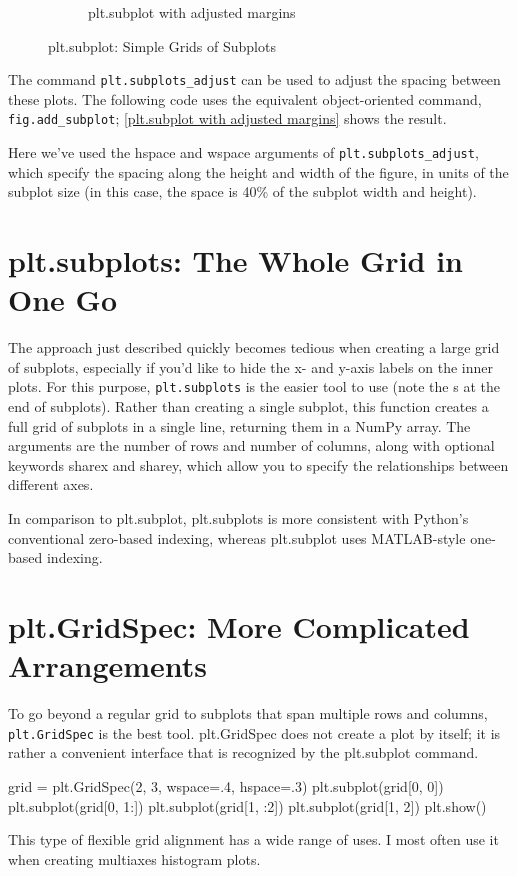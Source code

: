 \begin{figure}
\begin{subfigure}[b]{.45\textwidth}
        \caption{plt.subplot with adjusted margins}
        \label{plt.subplot with adjusted margins}
    \end{subfigure}
    \caption{plt.subplot: Simple Grids of Subplots}
\end{figure}

The command \verb|plt.subplots_adjust| can be used to adjust the spacing between
these plots. The following code uses the equivalent object-oriented command,
\verb|fig.add_subplot|; \autoref{plt.subplot with adjusted margins} shows the result.

Here we've used the hspace and wspace arguments of \verb|plt.subplots_adjust|, which
specify the spacing along the height and width of the figure, in units of the subplot
size (in this case, the space is 40\% of the subplot width and height).
\section{plt.subplots: The Whole Grid in One Go}
The approach just described quickly becomes tedious when creating a large grid of
subplots, especially if you'd like to hide the x- and y-axis labels on the inner plots. For
this purpose, \verb|plt.subplots| is the easier tool to use (note the s at the end of
subplots). Rather than creating a single subplot, this function creates a full grid of
subplots in a single line, returning them in a NumPy array. The arguments are the
number of rows and number of columns, along with optional keywords sharex and
sharey, which allow you to specify the relationships between different axes.

In comparison to plt.subplot, plt.subplots is more consistent with Python's conventional zero-based indexing, whereas plt.subplot uses MATLAB-style one-based
indexing.
\section{plt.GridSpec: More Complicated Arrangements}
To go beyond a regular grid to subplots that span multiple rows and columns,
\verb|plt.GridSpec| is the best tool. plt.GridSpec does not create a plot by itself; it is
rather a convenient interface that is recognized by the plt.subplot command.

\begin{pyc}
    grid = plt.GridSpec(2, 3, wspace=.4, hspace=.3)
    plt.subplot(grid[0, 0])
    plt.subplot(grid[0, 1:])
    plt.subplot(grid[1, :2])
    plt.subplot(grid[1, 2])
    plt.show()
\end{pyc}

This type of flexible grid alignment has a wide range of uses. I most often use it when
creating multiaxes histogram plots.
